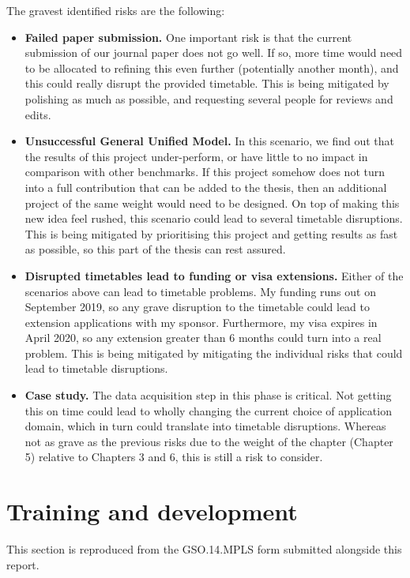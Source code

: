 \documentclass[pdftex,12pt,a4paper]{article}
\theoremstyle{definition}
\theoremstyle{remark}
\begin{document}
The gravest identified risks are the following:
\begin{itemize}
    \item \textbf{Failed paper submission.} One important risk is that the current submission of our journal paper does not go well. If so, more time would need to be allocated to refining this even further (potentially another month), and this could really disrupt the provided timetable. This is being mitigated by polishing as much as possible, and requesting several people for reviews and edits.
    \item \textbf{Unsuccessful General Unified Model.} In this scenario, we find out that the results of this project under-perform, or have little to no impact in comparison with other benchmarks. If this project somehow does not turn into a full contribution that can be added to the thesis, then an additional project of the same weight would need to be designed. On top of making this new idea feel rushed, this scenario could lead to several timetable disruptions. This is being mitigated by prioritising this project and getting results as fast as possible, so this part of the thesis can rest assured.
    \item \textbf{Disrupted timetables lead to funding or visa extensions.} Either of the scenarios above can lead to timetable problems. My funding runs out on September 2019, so any grave disruption to the timetable could lead to extension applications with my sponsor. Furthermore, my visa expires in April 2020, so any extension greater than 6 months could turn into a real problem. This is being mitigated by mitigating the individual risks that could lead to timetable disruptions.  
    \item \textbf{Case study.} The data acquisition step in this phase is critical. Not getting this on time could lead to wholly changing the current choice of application domain, which in turn could translate into timetable disruptions. Whereas not as grave as the previous risks due to the weight of the chapter (Chapter 5) relative to Chapters 3 and 6, this is still a risk to consider.
\end{itemize}

\section{Training and development}
This section is reproduced from the GSO.14.MPLS form submitted alongside this report.




\end{document}

